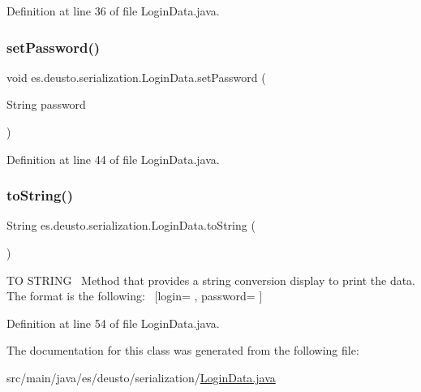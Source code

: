 Definition at line 36 of file Login\+Data.\+java.

\mbox{\label{classes_1_1deusto_1_1serialization_1_1_login_data_a8a744db82f9ddad859e04b6069502409}} 
\subsubsection{\texorpdfstring{set\+Password()}{setPassword()}}
{\footnotesize\ttfamily void es.\+deusto.\+serialization.\+Login\+Data.\+set\+Password (\begin{DoxyParamCaption}\item[{String}]{password }\end{DoxyParamCaption})}



Definition at line 44 of file Login\+Data.\+java.

\mbox{\label{classes_1_1deusto_1_1serialization_1_1_login_data_a638424167a2321d58645b31fe9aef420}} 
\subsubsection{\texorpdfstring{to\+String()}{toString()}}
{\footnotesize\ttfamily String es.\+deusto.\+serialization.\+Login\+Data.\+to\+String (\begin{DoxyParamCaption}{ }\end{DoxyParamCaption})}

TO S\+T\+R\+I\+NG~\newline
Method that provides a string conversion display to print the data. The format is the following\+:~\newline
\mbox{[}login= , password= \mbox{]} 

Definition at line 54 of file Login\+Data.\+java.



The documentation for this class was generated from the following file\+:\begin{DoxyCompactItemize}
\item 
src/main/java/es/deusto/serialization/\hyperlink{_login_data_8java}{Login\+Data.\+java}\end{DoxyCompactItemize}
